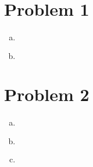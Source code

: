 \documentclass{article}
\begin{document}
\begin{flushleft}



	\section*{Problem 1}

	

\begin{enumerate}[(a)]

	

	\item 

\begin{multline*}\\

\end{multline*}



	\item 

\begin{multline*}\\

\end{multline*}



\end{enumerate}



	\section*{Problem 2}

\begin{enumerate}[(a)]

	

	\item 

\begin{multline*}\\

\end{multline*}



	\item 

\begin{multline*}\\

\end{multline*}



	\item 


\end{enumerate}
\end{flushleft}
\end{document}
